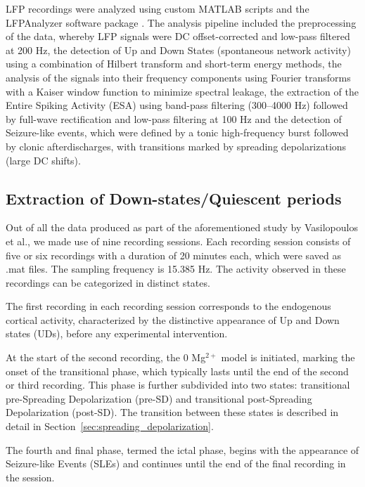 \documentclass{article}
\begin{document}
LFP recordings were analyzed using custom MATLAB scripts and the LFPAnalyzer software package \cite{kaplanian2022, tsakanikas2017}. The analysis pipeline included the preprocessing of the data, whereby LFP signals were DC offset-corrected and low-pass filtered at 200 Hz, the detection of Up and Down States (spontaneous network activity) using a combination of Hilbert transform and short-term energy methods, the analysis of the signals into their frequency components using Fourier transforms with a Kaiser window function to minimize spectral leakage, the extraction of the Entire Spiking Activity (ESA) using band-pass filtering (300--4000 Hz) followed by full-wave rectification and low-pass filtering at 100 Hz and the detection of Seizure-like events, which were defined by a tonic high-frequency burst followed by clonic afterdischarges, with transitions marked by spreading depolarizations (large DC shifts).

\subsection{Extraction of Down-states/Quiescent periods}
Out of all the data produced as part of the aforementioned study by Vasilopoulos et al., we made use of nine recording sessions. Each recording session consists of five or six recordings with a duration of 20 minutes each, which were saved as .mat files. The sampling frequency is 15.385 Hz. The activity observed in these recordings can be categorized in distinct states. 

The first recording in each recording session corresponds to the endogenous cortical activity, characterized by the distinctive appearance of Up and Down states (UDs), before any experimental intervention. 

At the start of the second recording, the 0 Mg$^{2+}$ model is initiated, marking the onset of the transitional phase, which typically lasts until the end of the second or third recording. This phase is further subdivided into two states: transitional pre-Spreading Depolarization (pre-SD) and transitional post-Spreading Depolarization (post-SD). The transition between these states is described in detail  in Section~\ref{sec:spreading_depolarization}.

The fourth and final phase, termed the ictal phase, begins with the appearance of Seizure-like Events (SLEs) and continues until the end of the final recording in the session. 
\end{document}
